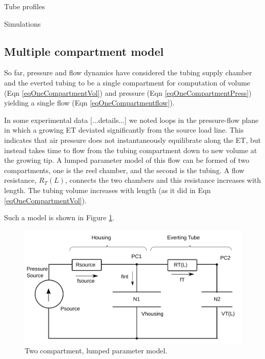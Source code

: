 \documentclass[letterpaper]{article}
\begin{document}
Tube profiles

Simulations


\subsection{Multiple compartment model}
So far, pressure and flow dynamics have considered the tubing supply chamber and the everted tubing to be a single compartment
for computation of volume (Eqn \ref{eqOneCompartmentVol}) and pressure (Eqn \ref{eqOneCompartmentPress}) yielding a single
flow (Eqn \ref{eqOneCompartmentflow}).

In some experimental data [...details...]  we noted loops in the pressure-flow plane in which a growing ET deviated
significantly from the source load line.   This indicates that air pressure does not instantaneously equilibrate
along the ET, but instead takes time to flow from the tubing compartment down to new volume at the growing tip.
A lumped parameter model of this flow can be formed of two compartments, one is the reel chamber, and the second is
the tubing.   A flow resistance, $R_T(L)$, connects the two chambers and this resistance increases with length.
The tubing volume increases with length (as it did in Eqn \ref{eqOneCompartmentVol}).

Such a model is shown in Figure \ref{Fig:TwoCompartment}.

\begin{figure}\centering
\includegraphics[width=.75\textwidth]{Figure_TwoCompartment.png}
\caption{Two compartment, lumped parameter model. }
\label{Fig:TwoCompartment}
\end{figure}

%
\end{document}
